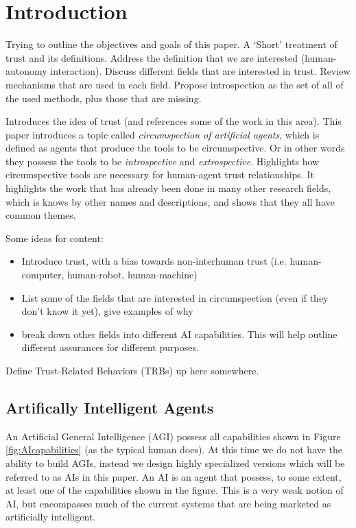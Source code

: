 \section{Introduction}
    Trying to outline the objectives and goals of this paper. A `Short' treatment of trust and its definitions. Address the definition that we are interested (human-autonomy interaction). Discuss different fields that are interested in trust. Review mechanisms that are used in each field. Propose introspection as the set of all of the used methods, plus those that are missing.
    
    Introduces the idea of trust (and references some of the work in this area). This paper introduces a topic called \emph{circumspection of artificial agents}, which is defined as agents that produce the tools to be circumspective. Or in other words they possess the tools to be \emph{introspective} and \emph{extrospective}. Highlights how circumspective tools are necessary for human-agent trust relationships. It highlights the work that has already been done in many other research fields, which is knows by other names and descriptions, and shows that they all have common themes.

    Some ideas for content:

    \begin{itemize}[htbp]
        \item Introduce trust, with a bias towards non-interhuman trust (i.e. human-computer, human-robot, human-machine)
        \item List some of the fields that are interested in circumspection (even if they don't know it yet), give examples of why
        \item break down other fields into different AI capabilities. This will help outline different assurances for different purposes.
    \end{itemize}

    Define Trust-Related Behaviors (TRBs) up here somewhere.
\subsection{Artifically Intelligent Agents}
    An Artificial General Intelligence (AGI) possess all capabilities shown in Figure \ref{fig:AIcapabilities} (as the typical human does). At this time we do not have the ability to build AGIs, instead we design highly specialized versions which will be referred to as AIs in this paper. An AI is an agent that possess, to some extent, at least one of the capabilities shown in the figure. This is a very weak notion of AI, but encompasses much of the current systems that are being marketed as artificially intelligent.

